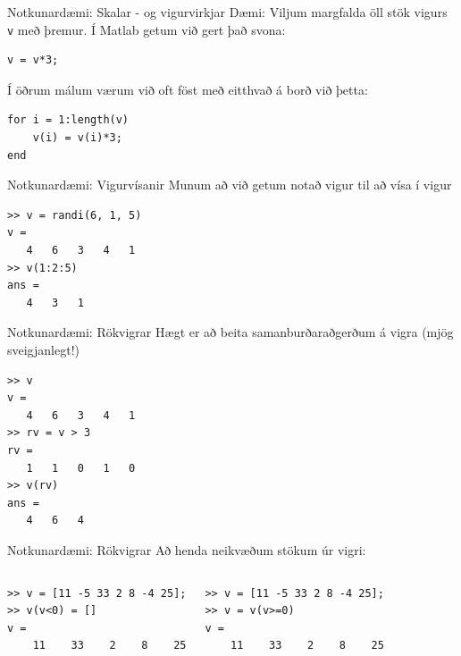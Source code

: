 \documentclass{beamer}
\begin{document}
\begin{frame}[fragile]{Notkunardæmi: Skalar - og vigurvirkjar}
\vspace{\baselineskip}
Dæmi: Viljum margfalda öll stök vigurs \texttt{v} með þremur. Í Matlab getum við gert það svona:
\begin{verbatim}
v = v*3;
\end{verbatim}
Í öðrum málum værum við oft föst með eitthvað á borð við þetta:
\begin{verbatim}
for i = 1:length(v)
    v(i) = v(i)*3;
end
\end{verbatim}
\end{frame}

\begin{frame}[fragile]{Notkunardæmi: Vigurvísanir}
Munum að við getum notað vigur til að vísa í vigur
\begin{verbatim}
>> v = randi(6, 1, 5)
v =
   4   6   3   4   1
>> v(1:2:5)
ans =
   4   3   1
\end{verbatim}
\end{frame}

\begin{frame}[fragile]{Notkunardæmi: Rökvigrar}
\vspace{\baselineskip}
Hægt er að beita samanburðaraðgerðum á vigra (mjög sveigjanlegt!)
\begin{verbatim}
>> v
v =
   4   6   3   4   1
>> rv = v > 3
rv =
   1   1   0   1   0
>> v(rv)
ans =
   4   6   4
\end{verbatim}
\end{frame}

\begin{frame}[fragile]{Notkunardæmi: Rökvigrar}
Að henda neikvæðum stökum úr vigri:
\begin{columns}
\begin{verbatim}
>> v = [11 -5 33 2 8 -4 25];
>> v(v<0) = []
v =
    11    33    2    8    25
\end{verbatim}
\begin{verbatim}
>> v = [11 -5 33 2 8 -4 25];
>> v = v(v>=0)
v =
    11    33    2    8    25
\end{verbatim}
\end{columns}
\end{frame}
\end{document}
